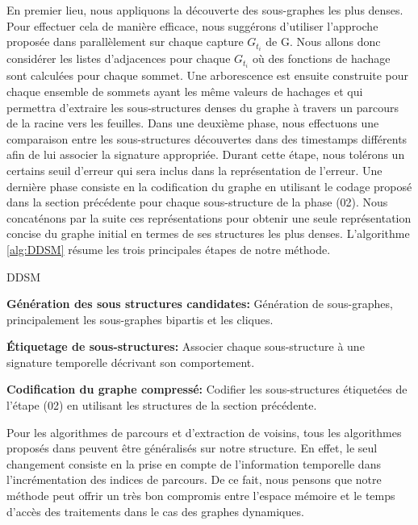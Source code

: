 			 En premier lieu, nous appliquons la découverte des sous-graphes les plus denses. Pour effectuer cela de manière efficace, nous suggérons d'utiliser l'approche proposée dans \citep{hernandez2014compressed} parallèlement sur chaque capture $G_{t_{i}}$ de G. Nous allons donc considérer les listes d'adjacences pour chaque $G_{t_{i}}$ où des fonctions de hachage sont calculées pour chaque sommet. Une arborescence est ensuite construite pour chaque ensemble de sommets ayant les même valeurs de hachages et qui permettra d'extraire les sous-structures denses du graphe à travers un parcours de la racine vers les feuilles. Dans une deuxième phase, nous effectuons une comparaison entre les sous-structures découvertes dans des timestamps différents afin de lui associer la signature appropriée. Durant cette étape, nous tolérons un certains seuil d'erreur qui sera inclus dans la représentation de l'erreur. Une dernière phase consiste en la codification du graphe en utilisant le codage proposé dans la section précédente pour chaque sous-structure de la phase (02). Nous concaténons par la suite ces représentations pour obtenir une seule représentation concise du graphe initial en termes de ses structures les plus denses. 
			L'algorithme \ref{alg:DDSM} résume les trois principales étapes de notre méthode.
			\begin{algorithm}
					\label{alg:DDSM}
					\caption{DDSM}
					\label{Pseudo Algorithme de la méthode proposée (DDSM)}
				\begin{algorithmic} [1]
					\STATE \textbf{Génération des sous structures candidates: }Génération de sous-graphes, principalement les sous-graphes bipartis et les cliques.
					
					\STATE  \textbf{Étiquetage de sous-structures: }Associer chaque sous-structure à une signature temporelle décrivant son comportement.
					
					\STATE \textbf{Codification du graphe compressé: }Codifier les sous-structures étiquetées de l'étape (02) en utilisant les structures de la section précédente.
				\end{algorithmic}
			\end{algorithm}
			
			Pour les algorithmes de parcours et d'extraction de voisins, tous les algorithmes proposés dans \citep{hernandez2014compressed} peuvent être généralisés sur notre structure. En effet, le seul changement consiste en la  prise en compte de l'information temporelle dans l'incrémentation des indices de parcours. De ce fait, nous pensons que notre méthode peut offrir un très bon compromis entre l'espace mémoire et le temps d'accès des traitements dans le cas des graphes dynamiques. 
			
